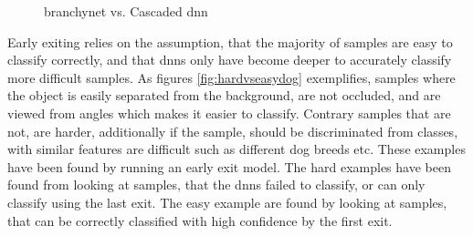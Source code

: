 \begin{figure}
	\hspace{2em}
	\caption[\gls{branchynet} vs. Cascaded \gls{dnn}]{\gls{branchynet} vs. Cascaded \gls{dnn}}
	\label{fig:cascaded-vs-branchy}
\end{figure}

Early exiting relies on the assumption, that the majority of samples are easy to classify correctly, and that \gls{dnn}s only have become deeper to accurately classify more difficult samples. As figures \ref{fig:hardvseasydog} exemplifies, samples where the object is easily separated from the background, are not occluded, and are viewed from angles which makes it easier to classify. Contrary samples that are not, are harder, additionally if the sample, should be discriminated from classes, with similar features are difficult such as different dog breeds etc. These examples have been found by running an early exit model. The hard examples have been found from looking at samples, that the \gls{dnn}s failed to classify, or can only classify using the last exit. The easy example are found by looking at samples, that can be correctly classified with high confidence by the first exit. 

